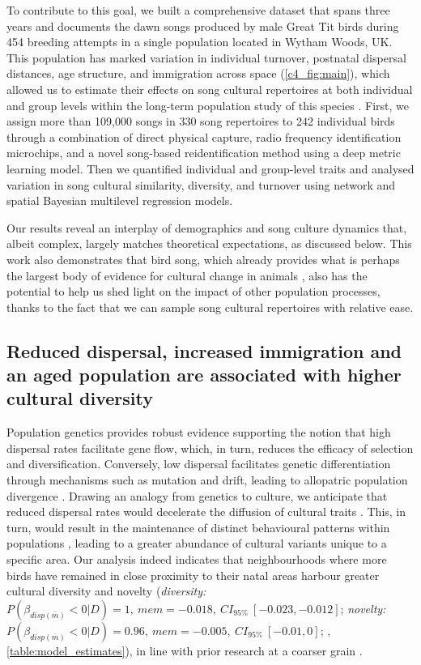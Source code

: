 To contribute to this goal, we built a comprehensive dataset that spans three years and documents the dawn songs produced by male Great Tit birds during 454 breeding attempts in a single population located in Wytham Woods, UK. This population has marked variation in individual turnover, postnatal dispersal distances, age structure, and immigration across space (\autoref{c4_fig:main}), which allowed us to estimate their effects on song cultural repertoires at both individual and group levels within the long-term population study of this species \parencite{lack1964}. First, we assign more than 109,000 songs in 330 song repertoires to 242 individual birds through a combination of direct physical capture, radio frequency identification microchips, and a novel song-based reidentification method using a deep metric learning model. Then we quantified individual and group-level traits and analysed variation in song cultural similarity, diversity, and turnover using network and spatial Bayesian multilevel regression models.

Our results reveal an interplay of demographics and song culture dynamics that, albeit complex, largely matches theoretical expectations, as discussed below. This work also demonstrates that bird song, which already provides what is perhaps the largest body of evidence for cultural change in animals \parencite{laland2006}, also has the potential to help us shed light on the impact of other population processes, thanks to the fact that we can sample song cultural repertoires with relative ease.


\subsection{Reduced dispersal, increased immigration and an aged population are associated with higher cultural diversity}

Population genetics provides robust evidence supporting the notion that high dispersal rates facilitate gene flow, which, in turn, reduces the efficacy of selection and diversification. Conversely, low dispersal facilitates genetic differentiation through mechanisms such as mutation and drift, leading to allopatric population divergence \parencite{suarez2022, claramunt2011, papadopoulou2009}. Drawing an analogy from genetics to culture, we anticipate that reduced dispersal rates would decelerate the diffusion of cultural traits \parencite{nunn2009}. This, in turn, would result in the maintenance of distinct behavioural patterns within populations \parencite{whitehead2012, planque2014}, leading to a greater abundance of cultural variants unique to a specific area. Our analysis indeed indicates that neighbourhoods where more birds have remained in close proximity to their natal areas harbour greater cultural diversity and novelty (\textit{diversity:} $P(\beta_{disp (\overline{m})} < 0 | D) = 1,~ mem = -0.018,~CI_{95\%}~[-0.023, -0.012]$; \textit{novelty:} $P(\beta_{disp (\overline{m})} < 0 | D) = 0.96,~ mem = -0.005,~CI_{95\%}~[-0.01, 0]$; , \autoref{table:model_estimates}), in line with prior research at a coarser grain \parencite{fayet2014}. 

